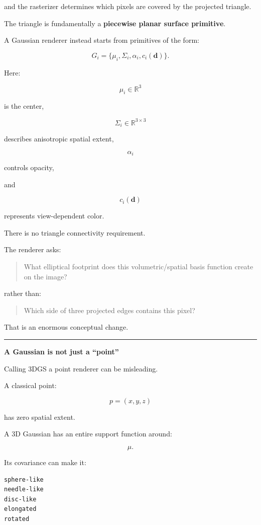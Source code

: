 and the rasterizer determines which pixels are covered by the projected triangle.

The triangle is fundamentally a \textbf{piecewise planar surface primitive}.

A Gaussian renderer instead starts from primitives of the form:

\[
G_i=
\{
\mu_i,
\Sigma_i,
\alpha_i,
c_i(\mathbf d)
\}.
\]

Here:

\[
\mu_i\in\mathbb R^3
\]

is the center,

\[
\Sigma_i\in\mathbb R^{3\times3}
\]

describes anisotropic spatial extent,

\[
\alpha_i
\]

controls opacity,

and

\[
c_i(\mathbf d)
\]

represents view-dependent color.

There is no triangle connectivity requirement.

The renderer asks:

\begin{quote}
What elliptical footprint does this volumetric/spatial basis function create on the image?
\end{quote}

rather than:

\begin{quote}
Which side of three projected edges contains this pixel?
\end{quote}

That is an enormous conceptual change.

\begin{center}\rule{0.5\linewidth}{0.5pt}\end{center}

\textbf{A Gaussian is not just a ``point''}

Calling 3DGS a point renderer can be misleading.

A classical point:

\[
p=(x,y,z)
\]

has zero spatial extent.

A 3D Gaussian has an entire support function around:

\[
\mu.
\]

Its covariance can make it:

\begin{verbatim}
sphere-like
needle-like
disc-like
elongated
rotated
\end{verbatim}

